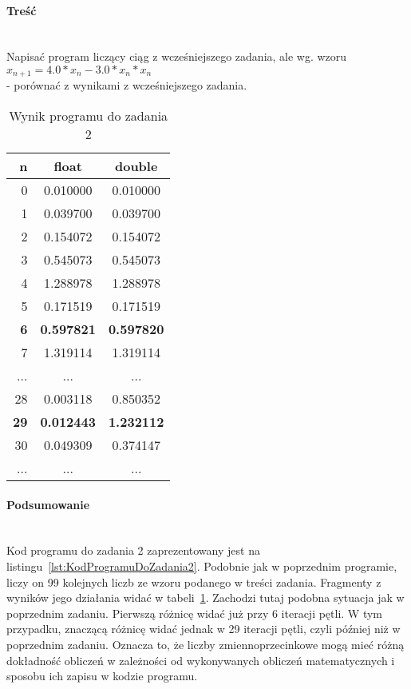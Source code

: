 \paragraph{Treść}~\\
Napisać program liczący ciąg z wcześniejszego zadania, ale wg. wzoru\\
$ x_{n+1} = 4.0 * x_{n} - 3.0 * x_{n} * x_{n} $\\
- porównać z wynikami z wcześniejszego zadania.



\begin{table}[h]
  \caption{Wynik programu do zadania 2}
  \label{tab:WynikProgramuDoZadania2}
  \centering
  \begin{tabular}{r|c|c}
    n & float & double\\
    \hline 0 & 0.010000 & 0.010000\\
    \hline 1 & 0.039700 & 0.039700\\
    \hline 2 & 0.154072 & 0.154072\\
    \hline 3 & 0.545073 & 0.545073\\
    \hline 4 & 1.288978 & 1.288978\\
    \hline 5 & 0.171519 & 0.171519\\
    \hline \textbf{6} & \textbf{0.597821} & \textbf{0.597820}\\
    \hline 7 & 1.319114 & 1.319114\\
    \hline ... & ... & ...\\
    \hline 28 & 0.003118 & 0.850352\\
    \hline \textbf{29} & \textbf{0.012443} & \textbf{1.232112}\\
    \hline 30 & 0.049309 & 0.374147\\
    \hline ... & ... & ...\\
    \hline
  \end{tabular}
\end{table}

\paragraph{Podsumowanie}~\\
Kod programu do zadania 2 zaprezentowany jest na listingu~\ref{lst:KodProgramuDoZadania2}.
Podobnie jak w poprzednim programie, liczy on 99 kolejnych liczb ze wzoru podanego w treści zadania.
Fragmenty z wyników jego działania widać w tabeli~\ref{tab:WynikProgramuDoZadania2}.
Zachodzi tutaj podobna sytuacja jak w poprzednim zadaniu.
Pierwszą różnicę widać już przy 6 iteracji pętli.
W tym przypadku, znaczącą różnicę widać jednak w 29 iteracji pętli, czyli później niż w poprzednim zadaniu.
Oznacza to, że liczby zmiennoprzecinkowe mogą mieć różną dokładność obliczeń w zależności od wykonywanych obliczeń matematycznych i sposobu ich zapisu w kodzie programu.
